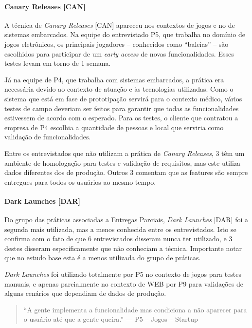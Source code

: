 \paragraph{Canary Releases [CAN]}

A técnica de \emph{Canary Releases} [CAN] apareceu nos contextos de jogos e no de sistemas embarcados. Na equipe do entrevistado P5, que trabalha no domínio de jogos eletrônicos, os principais jogadores -- conhecidos como ``baleias'' -- são escolhidos para participar de um \emph{early access} de novas funcionalidades.  Esses testes levam em torno de 1 semana. 

Já na equipe de P4, que trabalha com sistemas embarcados, a prática era necessária devido ao contexto de atuação e às tecnologias utilizadas. Como o sistema que está em fase de prototipação servirá para o contexto médico, vários testes de campo deveriam ser feitos para garantir que todas as funcionalidades estivessem de acordo com o esperado. Para os testes, o cliente que contratou a empresa de P4 escolhia a quantidade de pessoas e local que serviria como validação de funcionalidades.

Entre os entrevistados que não utilizam a prática de \emph{Canary Releases}, 3 têm um ambiente de homologação para testes e validação de requisitos, mas este utiliza dados diferentes dos de produção. Outros 3 comentam que as features são sempre entregues para todos os usuários ao mesmo tempo.


\paragraph{Dark Launches [DAR]}

Do grupo das práticas associadas a Entregas Parciais, \emph{Dark Launches} [DAR] foi a segunda mais utilizada, mas a menos conhecida entre os entrevistados. Isto se confirma com o fato de que 6 entrevistados disseram nunca ter utilizado, e 3 destes disseram especificamente que não conheciam a técnica. Importante notar que no estudo base \cite{empiricalStudy2016} esta é a menos utilizada do grupo de práticas.

\emph{Dark Launches} foi utilizado totalmente por P5 no contexto de jogos para testes manuais, e apenas parcialmente no contexto de WEB por P9 para validações de alguns cenários que dependiam de dados de produção.


\begin{quote}
    ``A gente implementa a funcionalidade mas condiciona a não aparecer para o usuário até que a gente queira.'' --- P5 -- Jogos -- Startup
\end{quote}

